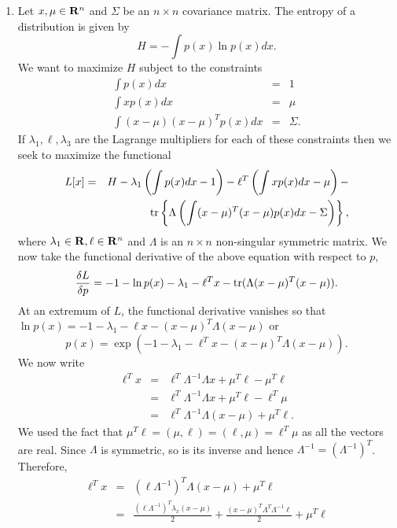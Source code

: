 \begin{enumerate}
\item Let $x, \mu \in \mathbf{R}^n$ and $\Sigma$ be an $n \times n$ covariance matrix. The entropy of a 
distribution is given by
\[
H = -\int p(x)\ln p(x)dx.
\]
We want to maximize $H$ subject to the constraints
\begin{eqnarray}
\int p(x)dx &=& 1 \label{c2pe14} \\
\int xp(x)dx &=& \mu \label{c2pe15} \\
\int (x - \mu)(x - \mu)^Tp(x)dx &=& \Sigma \label{c2pe16} .
\end{eqnarray}
If $\lambda_1, \ell, \lambda_3$ are the Lagrange multipliers for each of these constraints then
we seek to maximize the functional
\begin{eqnarray*}
L[x] &=& H - \lambda_1\left(\int p(x)dx - 1\right) - \ell^T\left(\int xp(x)dx - \mu\right) - \\
 & & \operatorname{tr}\left\{\Lambda\left(\int(x-\mu)^T(x-\mu)p(x)dx - \Sigma\right)\right\},
\end{eqnarray*}
where $\lambda_1 \in \mathbf{R}, \ell \in \mathbf{R}^n$ and $\Lambda$ is an $n \times n$ non-singular 
symmetric matrix. We now take the functional derivative of the above equation with respect to $p$,
\[
\frac{\delta L}{\delta p} = -1 - \ln p(x) - \lambda_1 - \ell^T x - \operatorname{tr}(\Lambda (x - \mu)^T(x - \mu)).
\]
At an extremum of $L$, the functional derivative vanishes so that $\ln p(x) = -1 - \lambda_1 - \ell x
- (x - \mu)^T\Lambda(x - \mu)$ or
\begin{equation}\label{c2pe17}
p(x) = \exp\left(-1 - \lambda_1 - \ell^T x - (x - \mu)^T\Lambda(x - \mu)\right).
\end{equation}
We now write 
\begin{eqnarray*}
\ell^T x &=& \ell^T \Lambda^{-1} \Lambda x + \mu^T\ell - \mu^T\ell \\
 &=&  \ell^T \Lambda^{-1} \Lambda x + \mu^T\ell - \ell^T\mu \\
 &=& \ell^T\Lambda^{-1}\Lambda(x - \mu) + \mu^T\ell.
\end{eqnarray*}
We used the fact that $\mu^T\ell = (\mu, \ell) = (\ell, \mu) = \ell^T\mu$ as all
the vectors are real. Since $\Lambda$ is symmetric, so is its inverse and hence $\Lambda^{-1}
= (\Lambda^{-1})^T$. Therefore,
\begin{eqnarray*}
\ell^T x &=& (\ell\Lambda^{-1})^T\Lambda(x - \mu) + \mu^T\ell \\
 &=& \frac{(\ell\Lambda^{-1})^T\lambda_x(x - \mu)}{2} + \frac{(x - \mu)^T\Lambda^T\Lambda^{-1}\ell}{2} + \mu^T\ell
\end{eqnarray*}

\end{enumerate}
